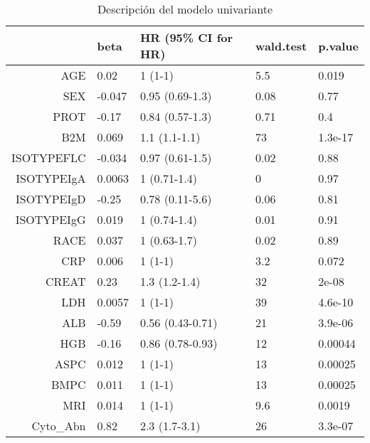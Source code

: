\begin{table}[ht]
\centering
\begin{tabular}{rllll}
  \hline
 & beta & HR (95\% CI for HR) & wald.test & p.value \\ 
  \hline
AGE & 0.02 & 1 (1-1) & 5.5 & 0.019 \\ 
  SEX & -0.047 & 0.95 (0.69-1.3) & 0.08 & 0.77 \\ 
  PROT & -0.17 & 0.84 (0.57-1.3) & 0.71 & 0.4 \\ 
  B2M & 0.069 & 1.1 (1.1-1.1) & 73 & 1.3e-17 \\ 
  ISOTYPEFLC & -0.034 & 0.97 (0.61-1.5) & 0.02 & 0.88 \\ 
  ISOTYPEIgA & 0.0063 & 1 (0.71-1.4) & 0 & 0.97 \\ 
  ISOTYPEIgD & -0.25 & 0.78 (0.11-5.6) & 0.06 & 0.81 \\ 
  ISOTYPEIgG & 0.019 & 1 (0.74-1.4) & 0.01 & 0.91 \\ 
  RACE & 0.037 & 1 (0.63-1.7) & 0.02 & 0.89 \\ 
  CRP & 0.006 & 1 (1-1) & 3.2 & 0.072 \\ 
  CREAT & 0.23 & 1.3 (1.2-1.4) & 32 & 2e-08 \\ 
  LDH & 0.0057 & 1 (1-1) & 39 & 4.6e-10 \\ 
  ALB & -0.59 & 0.56 (0.43-0.71) & 21 & 3.9e-06 \\ 
  HGB & -0.16 & 0.86 (0.78-0.93) & 12 & 0.00044 \\ 
  ASPC & 0.012 & 1 (1-1) & 13 & 0.00025 \\ 
  BMPC & 0.011 & 1 (1-1) & 13 & 0.00025 \\ 
  MRI & 0.014 & 1 (1-1) & 9.6 & 0.0019 \\ 
  Cyto\_Abn & 0.82 & 2.3 (1.7-3.1) & 26 & 3.3e-07 \\ 
   \hline
\end{tabular}
\caption{Descripción del modelo univariante} 
\label{Tabla: Cox Univariante}
\end{table}
